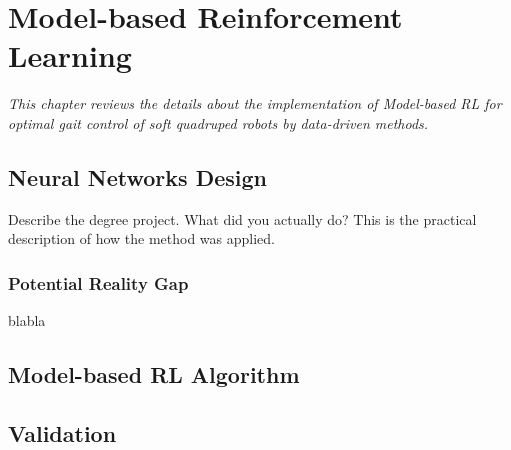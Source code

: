 \chapter{Model-based Reinforcement Learning}
\label{chap4}
\textit{This chapter reviews the details about the implementation of Model-based \ac{RL} for optimal gait control of soft quadruped robots by data-driven methods.}
\section{Neural Networks Design}
Describe the degree project. What did you actually do? This is the practical description of how the method was applied.
\subsection{Potential Reality Gap}
blabla

\section{Model-based RL Algorithm}

\section{Validation}